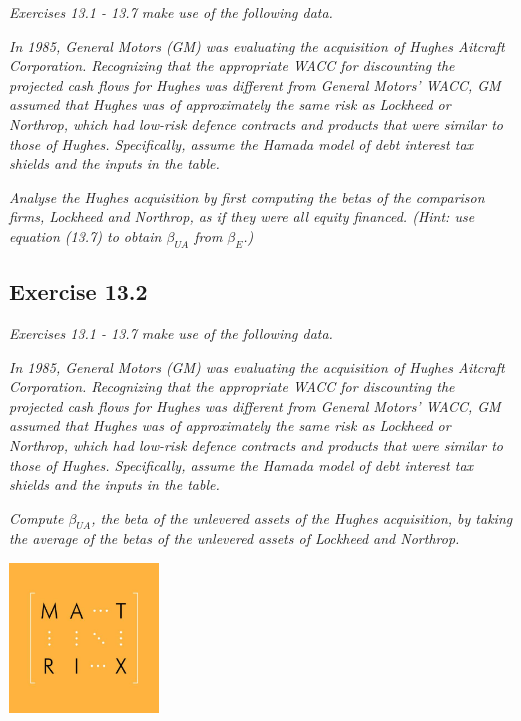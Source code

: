 \documentclass[]{book}
\theoremstyle{definition}
\theoremstyle{definition}
\theoremstyle{remark}
\begin{document}
\emph{Exercises 13.1 - 13.7 make use of the following data.}
\citep[p.458]{book}

\emph{In 1985, General Motors (GM) was evaluating the acquisition of
Hughes Aitcraft Corporation. Recognizing that the appropriate WACC for
discounting the projected cash flows for Hughes was different from
General Motors' WACC, GM assumed that Hughes was of approximately the
same risk as Lockheed or Northrop, which had low-risk defence contracts
and products that were similar to those of Hughes. Specifically, assume
the Hamada model of debt interest tax shields and the inputs in the
table.} \citep[p.458]{book}

\emph{Analyse the Hughes acquisition by first computing the betas of the
comparison firms, Lockheed and Northrop, as if they were all equity
financed. (Hint: use equation (13.7) to obtain \(\beta_{UA}\) from
\(\beta_E\).)} \citep[p.459]{book}

\subsection{Exercise 13.2}\label{exercise-13.2}

\emph{Exercises 13.1 - 13.7 make use of the following data.}
\citep[p.458]{book}

\emph{In 1985, General Motors (GM) was evaluating the acquisition of
Hughes Aitcraft Corporation. Recognizing that the appropriate WACC for
discounting the projected cash flows for Hughes was different from
General Motors' WACC, GM assumed that Hughes was of approximately the
same risk as Lockheed or Northrop, which had low-risk defence contracts
and products that were similar to those of Hughes. Specifically, assume
the Hamada model of debt interest tax shields and the inputs in the
table.} \citep[p.458]{book}

\emph{Compute \(\beta_{UA}\), the beta of the unlevered assets of the
Hughes acquisition, by taking the average of the betas of the unlevered
assets of Lockheed and Northrop.} \citep[p.459]{book}

\begin{center}\includegraphics[width=150px]{figures/matrix} \end{center}
\end{document}
